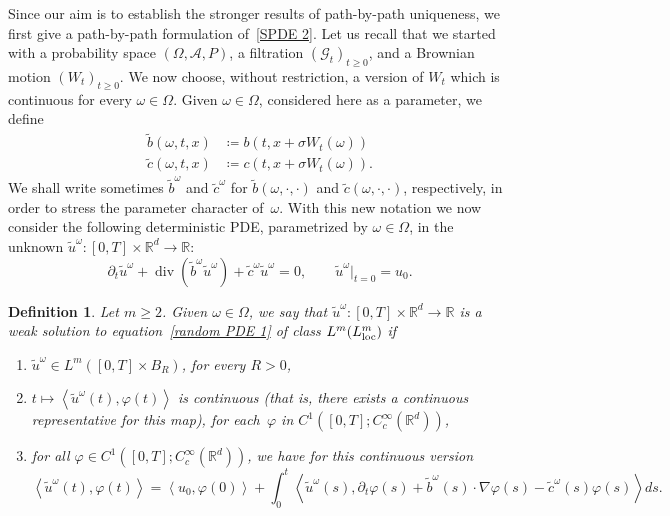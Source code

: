 \documentclass[a4paper,10pt]{article}
\newtheorem{definition}[theorem]{Definition}
\newcommand\1{\mathbbm{1}}
\newcommand\loc{{\rm loc}}
\DeclareMathOperator{\diverg}{div}
\numberwithin{equation}{section}
\begin{document}
Since our aim is to establish the stronger results of path-by-path uniqueness, we first give a path-by-path formulation of~\eqref{SPDE 2}. Let us recall that we started with a probability space $(\Omega,\mathcal{A},P)$, a filtration $(\mathcal{G}_{t})_{t\geq0}$, and a Brownian motion $(W_{t})_{t\geq0}$. We now choose, without restriction, a version of $W_{t}$ which is continuous for every $\omega\in\Omega$. Given $\omega\in\Omega$, considered here as a parameter, we define
\begin{align*}
\widetilde{b}(\omega,t,x) &  \coloneqq b(t,x+\sigma W_{t}(\omega)) \\
\widetilde{c}(\omega,t,x) &  \coloneqq c(t,x+\sigma W_{t}(\omega)) .
\end{align*}
We shall write sometimes $\widetilde{b}^{\omega}$ and $\widetilde{c}^{\omega}$ for $\widetilde{b}(\omega,\cdot,\cdot)$ and $\widetilde{c}(\omega,\cdot,\cdot)$, respectively, in order to stress the parameter character of~$\omega$. With this new notation we now consider the following deterministic PDE, parametrized by $\omega\in\Omega$, in the unknown $\widetilde{u}^{\omega} \colon [0,T]\times\mathbb{R}^{d}\rightarrow\mathbb{R}$:
\begin{equation}
\partial_t \widetilde{u}^{\omega} + \diverg (\widetilde{b}^{\omega}\widetilde{u}^{\omega})  +\widetilde{c}^{\omega}\widetilde{u}^{\omega}=0,\qquad\widetilde{u}^{\omega}|_{t=0}=u_{0}.  
\label{random PDE 1}
\end{equation}

\begin{definition}
\label{Def weak sol random PDE}
Let $m\geq2$. Given $\omega\in\Omega$, we say that $\widetilde{u}^{\omega} \colon [0,T] \times\mathbb{R}^{d}\rightarrow\mathbb{R}$ is a \emph{weak solution to equation~\eqref{random PDE 1} of class $L^{m}(L^{m}_\loc)$} if 
\begin{enumerate}[font=\normalfont, label=(\roman{*}), ref=(\roman{*})]
 \item $\widetilde{u}^{\omega}\in L^{m}([0,T] \times B_{R})$, for every $R>0$,  \label{rand_Def_1}
 \item $t\mapsto\left\langle \widetilde{u}^{\omega}(t),\varphi(t)\right\rangle $ is continuous \textup{(}that is, there exists a continuous representative for this map\textup{)}, for each~$\varphi$ in $C^1([0,T];C_{c}^{\infty}(\mathbb{R}^{d}))$,
 \item for all $\varphi\in C^1([0,T];C_{c}^{\infty}(\mathbb{R}^{d}))$, we have for this continuous version
 \begin{equation}\label{formulation_randomPDE}
 \left\langle \widetilde{u}^{\omega}(t)  ,\varphi(t)\right\rangle =\left\langle u_{0},\varphi(0)\right\rangle +\int^t_0\left\langle \widetilde{u}^\omega(s),\partial_t\varphi(s) + \widetilde{b}^{\omega}(s)  \cdot\nabla\varphi(s)-\widetilde{c}^{\omega}(s)  \varphi(s) \right\rangle ds .
 \end{equation}
\end{enumerate}
\end{definition}
\end{document}
